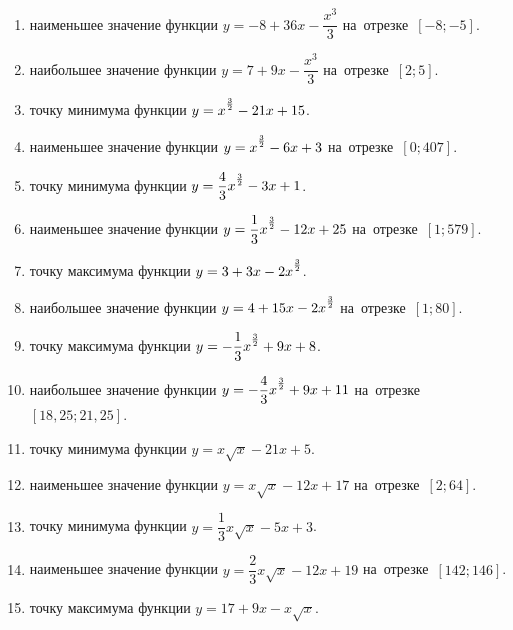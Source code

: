 \documentclass[a4paper,10pt]{article}
\begin{document}
\begin{enumerate}
\item {} наименьшее значение функции $y=-8 +36x-\dfrac{x^3}{3}$ на~отрезке~$\left[-8;-5\right]$.

\item {} наибольшее значение функции $y=7 +9x-\dfrac{x^3}{3}$ на~отрезке~$\left[2;5\right]$.

\item {} точку минимума функции $y=x\strut^{\frac{3}{2}} -21x+15$.

\item {} наименьшее значение функции $y=x\strut^{\frac{3}{2}} -6x+3$ на~отрезке~$\left[0;407\right]$.

\item {} точку минимума функции $y=\dfrac{4}{3}x\strut^{\frac{3}{2}} -3x+1$.

\item {} наименьшее значение функции $y=\dfrac{1}{3}x\strut^{\frac{3}{2}} -12x+25$ на~отрезке~$\left[1;579\right]$.

\item {} точку максимума функции $y=3+3x-2x\strut^{\frac{3}{2}}$.

\item {} наибольшее значение функции $y=4+15x-2x\strut^{\frac{3}{2}}$ на~отрезке~$\left[1;80\right]$.

\item {} точку максимума функции $y=-\dfrac{1}{3}x\strut^{\frac{3}{2}} +9x+8$.

\item {} наибольшее значение функции $y=-\dfrac{4}{3}x\strut^{\frac{3}{2}} +9x+11$ на~отрезке~$\left[18,25;21,25\right]$.

\item {} точку минимума функции $y=x\sqrt{x} -21x+5$.

\item {} наименьшее значение функции $y=x\sqrt{x} -12x+17$ на~отрезке~$\left[2;64\right]$.

\item {} точку минимума функции $y=\dfrac{1}{3}x\sqrt{x} -5x+3$.

\item {} наименьшее значение функции $y=\dfrac{2}{3}x\sqrt{x} -12x+19$ на~отрезке~$\left[142;146\right]$.

\item {} точку максимума функции $y=17+9x -x\sqrt{x}$.


\end{enumerate}
\end{document}
